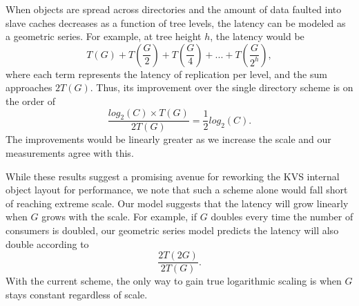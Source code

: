 When objects are spread across directories and the amount of data
faulted into slave caches decreases as a function of tree levels, 
the latency can be modeled as a geometric series.
For example, at tree height $h$, the latency would be 
\begin{equation}
T(G) + T(\frac{G}{2}) + T(\frac{G}{4}) + ... + T(\frac{G}{2^h}),
\end{equation}
where each term represents the latency of replication per level,
and the sum approaches $2T(G)$. Thus, its improvement over the single
directory scheme is on the order of 
\begin{equation}
\frac{log_2(C) \times T(G)}{2 T(G)} = \frac{1}{2}log_2(C).
\end{equation}
The improvements would be linearly 
greater as we increase the scale and our measurements agree with this. 

While these results suggest a promising avenue for reworking the KVS internal
object layout for performance, we note that such a scheme alone
would fall short of reaching extreme scale.
Our model suggests that the latency will grow linearly when $G$ grows
with the scale. For example, if $G$ doubles every time the number of
consumers is doubled, our geometric series model predicts the latency will
also double according to
\begin{equation}
\frac{2T(2G)}{2T(G)}.
\end{equation}
With the current scheme, the only way to gain true logarithmic
scaling is when $G$ stays constant regardless of scale. 
